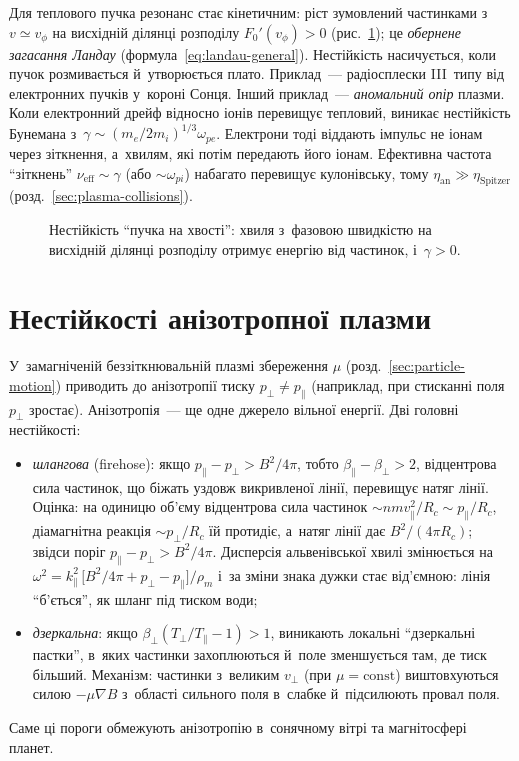 Для теплового пучка резонанс стає кінетичним: ріст зумовлений частинками з~$v\simeq v_\phi$ на
висхідній ділянці розподілу $F_0'(v_\phi)>0$ (рис.~\ref{fig:bump-on-tail}); це
\emph{обернене загасання Ландау} (формула~\eqref{eq:landau-general}). Нестійкість насичується,
коли пучок розмивається й~утворюється плато. Приклад~--- радіосплески III~типу від електронних
пучків у~короні Сонця. Інший приклад~--- \emph{аномальний опір} плазми. Коли електронний дрейф відносно іонів
перевищує тепловий, виникає нестійкість Бунемана з~$\gamma\sim(m_e/2m_i)^{1/3}\omega_{pe}$.
Електрони тоді віддають імпульс не іонам через зіткнення, а~хвилям, які потім передають його іонам.
Ефективна частота \enquote{зіткнень} $\nu_\mathrm{eff}\sim\gamma$ (або $\sim\omega_{pi}$) набагато перевищує кулонівську,
тому $\eta_\mathrm{an}\gg\eta_\mathrm{Spitzer}$ (розд.~\ref{sec:plasma-collisions}).

\begin{figure}[ht]
\centering
{}
\caption{Нестійкість \enquote{пучка на хвості}: хвиля з~фазовою швидкістю на висхідній ділянці
розподілу отримує енергію від частинок, і~$\gamma>0$.}
\label{fig:bump-on-tail}
\end{figure}

\section{Нестійкості анізотропної плазми}\label{sec:anisotropy-instabilities}

У~замагніченій беззіткнювальній плазмі збереження $\mu$ (розд.~\ref{sec:particle-motion}) приводить до
анізотропії тиску $p_\perp\ne p_\parallel$ (наприклад, при стисканні поля $p_\perp$ зростає).
Анізотропія~--- ще одне джерело вільної енергії. Дві головні нестійкості:
\begin{itemize}
	\item \emph{шлангова} (firehose): якщо $p_\parallel-p_\perp>B^2/4\pi$, тобто
	  $\beta_\parallel-\beta_\perp>2$, відцентрова сила частинок, що біжать уздовж викривленої лінії,
	  перевищує натяг лінії. Оцінка: на одиницю об'єму відцентрова сила частинок $\sim nmv_\parallel^2/R_c\sim p_\parallel/R_c$,
	  діамагнітна реакція $\sim p_\perp/R_c$ їй протидіє, а~натяг лінії дає $B^2/(4\pi R_c)$; звідси поріг
	  $p_\parallel-p_\perp>B^2/4\pi$. Дисперсія альвенівської хвилі змінюється на
	  $\omega^2=k_\parallel^2\,\bigl[B^2/4\pi+p_\perp-p_\parallel\bigr]/\rho_m$ і~за зміни знака дужки
	  стає від'ємною: лінія \enquote{б'ється}, як шланг під тиском води;
	\item \emph{дзеркальна}: якщо $\beta_\perp(T_\perp/T_\parallel-1)>1$, виникають
	  локальні \enquote{дзеркальні пастки}, в~яких частинки захоплюються й~поле зменшується там,
	  де тиск більший. Механізм: частинки з~великим $v_\perp$ (при $\mu=\mathrm{const}$) виштовхуються силою $-\mu\nabla B$
	  з~області сильного поля в~слабке й~підсилюють провал поля.
\end{itemize}
Саме ці пороги обмежують анізотропію в~сонячному вітрі та магнітосфері планет.

